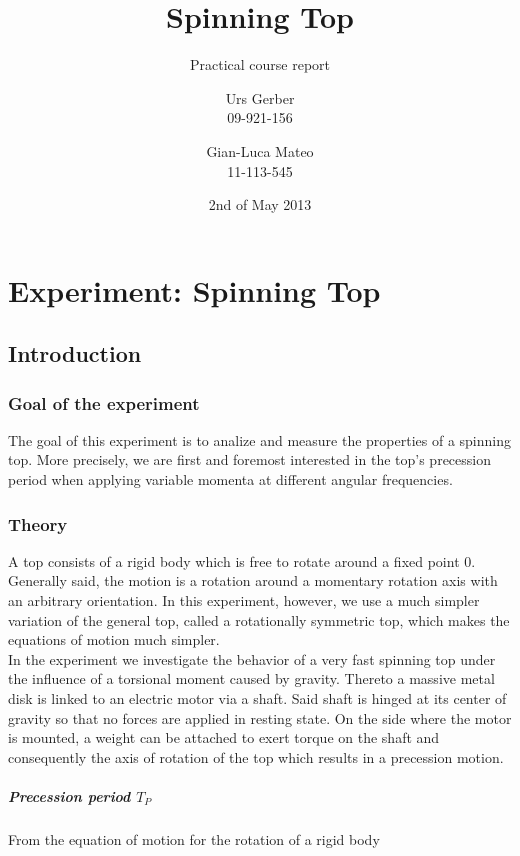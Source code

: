 \documentclass{scrreprt}
\author{Urs Gerber\\09-921-156 \and Gian-Luca Mateo\\11-113-545}
\date{2nd of May 2013}
\title{Spinning Top}
\subtitle{Practical course report}
\begin{document}
\maketitle

\tableofcontents
\newpage

\chapter{Experiment: Spinning Top}

\section{Introduction}

\subsection{Goal of the experiment}
The goal of this experiment is to analize and measure the properties of a spinning top. More precisely, we are first and foremost interested in the top's precession period when applying variable momenta at different angular frequencies.
 
\subsection{Theory}
A top consists of a rigid body which is free to rotate around a fixed point $0$. Generally said, the motion is a rotation around a momentary rotation axis with an arbitrary orientation. In this experiment, however, we use a much simpler variation of the general top, called a rotationally symmetric top, which makes the equations of motion much simpler.\\

In the experiment we investigate the behavior of a very fast spinning top under the influence of a torsional moment caused by gravity. Thereto a massive metal disk is linked to an electric motor via a shaft. Said shaft is hinged at its center of gravity so that no forces are applied in resting state. On the side where the motor is mounted, a weight can be attached to exert torque on the shaft and consequently the axis of rotation of the top which results in a precession motion.\\

\paragraph*{Precession period $T_P$}
From the equation of motion for the rotation of a rigid body 
\end{document}

